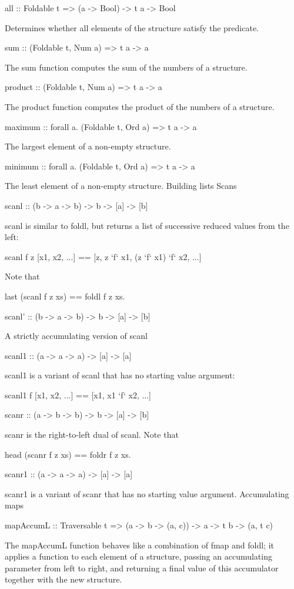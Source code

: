 all :: Foldable t => (a -> Bool) -> t a -> Bool

Determines whether all elements of the structure satisfy the predicate.

sum :: (Foldable t, Num a) => t a -> a

The sum function computes the sum of the numbers of a structure.

product :: (Foldable t, Num a) => t a -> a

The product function computes the product of the numbers of a structure.

maximum :: forall a. (Foldable t, Ord a) => t a -> a

The largest element of a non-empty structure.

minimum :: forall a. (Foldable t, Ord a) => t a -> a

The least element of a non-empty structure.
Building lists
Scans

scanl :: (b -> a -> b) -> b -> [a] -> [b]

scanl is similar to foldl, but returns a list of successive reduced values from the left:

scanl f z [x1, x2, ...] == [z, z `f` x1, (z `f` x1) `f` x2, ...]

Note that

last (scanl f z xs) == foldl f z xs.

scanl' :: (b -> a -> b) -> b -> [a] -> [b]

A strictly accumulating version of scanl

scanl1 :: (a -> a -> a) -> [a] -> [a]

scanl1 is a variant of scanl that has no starting value argument:

scanl1 f [x1, x2, ...] == [x1, x1 `f` x2, ...]

scanr :: (a -> b -> b) -> b -> [a] -> [b]

scanr is the right-to-left dual of scanl. Note that

head (scanr f z xs) == foldr f z xs.

scanr1 :: (a -> a -> a) -> [a] -> [a]

scanr1 is a variant of scanr that has no starting value argument.
Accumulating maps

mapAccumL :: Traversable t => (a -> b -> (a, c)) -> a -> t b -> (a, t c)

The mapAccumL function behaves like a combination of fmap and foldl; it applies a function to each element of a structure, passing an accumulating parameter from left to right, and returning a final value of this accumulator together with the new structure.

